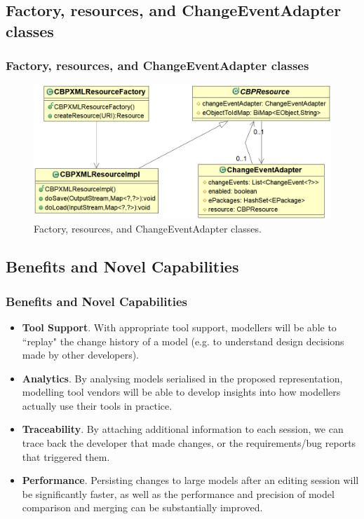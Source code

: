 \documentclass{beamer}
\begin{document}
\begin{frame}
\section{Factory, resources, and ChangeEventAdapter classes}
\frametitle{Factory, resources, and ChangeEventAdapter classes}
\begin{figure}[th]
\includegraphics[scale=0.4]{resources}
\caption{Factory, resources, and ChangeEventAdapter classes.}
\end{figure}
\end{frame}


\begin{frame}
\section{Benefits and Novel Capabilities}
\frametitle{Benefits and Novel Capabilities}
\begin{itemize}
\item \textbf{Tool Support}. With appropriate tool support, modellers will be able to ``replay" the change history of a model (e.g. to understand design decisions made by other developers). 
\item \textbf{Analytics}. By analysing models serialised in the proposed representation, modelling tool vendors will be able to develop insights into how modellers actually use their tools in practice.
\item \textbf{Traceability}. By attaching additional information to each session, we can trace back the developer that made changes, or the requirements/bug reports that triggered them.
\item \textbf{Performance}. Persisting changes to large models after an editing session will be significantly faster, as well as the performance and precision of model comparison and merging can be substantially improved.
\end{itemize}
\end{frame}
\end{document}
